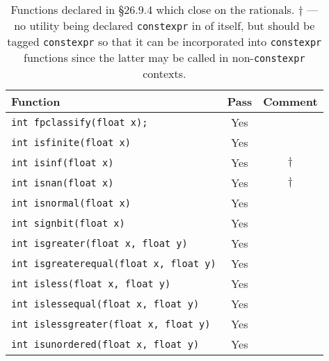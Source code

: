 \documentclass[prd,twocolumn,amsmath,amssymb,nofootinbib,eqsecnum]{revtex4-1}
\newcommand{\constexpr}{\code{constexpr}\xspace}
\newcommand{\code}[1]{{\tt #1}}
\begin{document}
\begin{table}[h]
	\begin{tabular}{lcc}
		Function & Pass & Comment
	\\
	\hline \hline
		\code{int fpclassify(float x);} & Yes &
	\\
	\hline
		\code{int isfinite(float x)} & Yes &
	\\
	\hline
		\code{int isinf(float x)} & Yes & $\dagger$
	\\
	\hline
		\code{int isnan(float x)} & Yes & $\dagger$ 
	\\
	\hline
		\code{int isnormal(float x)} & Yes &
	\\
	\hline
		\code{int signbit(float x)} & Yes &
	\\
	\hline
		\code{int isgreater(float x, float y)} & Yes &
	\\
	\hline
		\code{int isgreaterequal(float x, float y)} & Yes &
	\\
	\hline
		\code{int isless(float x, float y)} & Yes &
	\\
	\hline
		\code{int islessequal(float x, float y)} & Yes &
	\\
	\hline
		\code{int islessgreater(float x, float y)} & Yes &
	\\
	\hline
		\code{int isunordered(float x, float y)} & Yes &
	\end{tabular}
\caption{Functions declared in \S 26.9.4 which close on the rationals. $\dagger$ --- no utility being declared \constexpr in of itself, but should be tagged \constexpr so that it can be incorporated into \constexpr functions since the latter may be called in  non-\constexpr contexts.}
\label{tab:26.9.4}
\end{table}
\end{document}
